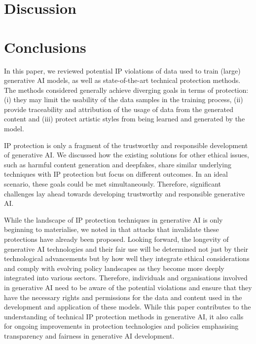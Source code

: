 \documentclass[conference,table]{IEEEtran} %
\begin{document}


\section{Discussion}\label{sec:discussion}



\section{Conclusions}\label{sec:conclusion}
In this paper, we reviewed potential IP violations of data used to train (large) generative AI models, as well as state-of-the-art technical protection methods.
The methods considered generally achieve diverging goals in terms of protection: (i) they may limit the usability of the data samples in the training process, (ii) provide traceability and attribution of the usage of data from the generated content and (iii) protect artistic styles from being learned and generated by the model.

IP protection is only a fragment of the trustworthy and responsible development of generative AI.
We discussed how the existing solutions for other ethical issues, such as harmful content generation and deepfakes, share similar underlying techniques with IP protection but focus on different outcomes.
In an ideal scenario, these goals could be met simultaneously. Therefore, significant challenges lay ahead towards developing trustworthy and responsible generative AI. 

While the landscape of IP protection techniques in generative AI is only beginning to materialise, we noted in  that attacks that invalidate these protections have already been proposed.
Looking forward, the longevity of generative AI technologies and their fair use will be determined not just by their technological advancements but by how well they integrate ethical considerations and comply with evolving policy landscapes as they become more deeply integrated into various sectors.
Therefore, individuals and organisations involved in generative AI need to be aware of the potential violations and ensure that they have the necessary rights and permissions for the data and content used in the development and application of these models. 
While this paper contributes to the understanding of technical IP protection methods in generative AI, it also calls for ongoing improvements in protection technologies and policies emphasising transparency and fairness in generative AI development.
\end{document}
